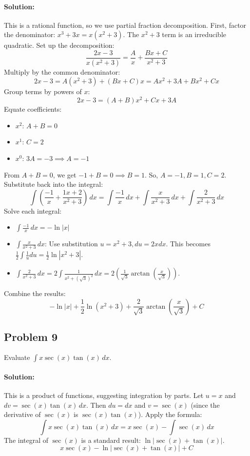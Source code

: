 \documentclass{article}
\begin{document}
\paragraph{Solution:} This is a rational function, so we use partial fraction decomposition.
First, factor the denominator: $x^3 + 3x = x(x^2 + 3)$. The $x^2+3$ term is an irreducible quadratic.
Set up the decomposition:
\[ \frac{2x-3}{x(x^2+3)} = \frac{A}{x} + \frac{Bx+C}{x^2+3} \]
Multiply by the common denominator:
\[ 2x-3 = A(x^2+3) + (Bx+C)x = Ax^2 + 3A + Bx^2 + Cx \]
Group terms by powers of $x$:
\[ 2x-3 = (A+B)x^2 + Cx + 3A \]
Equate coefficients:
\begin{itemize}
    \item $x^2$: $A+B = 0$
    \item $x^1$: $C = 2$
    \item $x^0$: $3A = -3 \implies A = -1$
\end{itemize}
From $A+B=0$, we get $-1+B=0 \implies B=1$.
So, $A=-1, B=1, C=2$.
Substitute back into the integral:
\[ \int \left( \frac{-1}{x} + \frac{1x+2}{x^2+3} \right) \, dx = \int \frac{-1}{x} \, dx + \int \frac{x}{x^2+3} \, dx + \int \frac{2}{x^2+3} \, dx \]
Solve each integral:
\begin{itemize}
    \item $\int \frac{-1}{x} \, dx = -\ln|x|$
    \item $\int \frac{x}{x^2+3} \, dx$: Use substitution $u=x^2+3, du=2xdx$. This becomes $\frac{1}{2}\int \frac{1}{u}du = \frac{1}{2}\ln|x^2+3|$.
    \item $\int \frac{2}{x^2+3} \, dx = 2 \int \frac{1}{x^2+(\sqrt{3})^2} \, dx = 2 \left( \frac{1}{\sqrt{3}}\arctan\left(\frac{x}{\sqrt{3}}\right) \right)$.
\end{itemize}
Combine the results:
\[ \boxed{-\ln|x| + \frac{1}{2}\ln(x^2+3) + \frac{2}{\sqrt{3}}\arctan\left(\frac{x}{\sqrt{3}}\right) + C} \]

\subsection{Problem 9}
Evaluate $\int x \sec(x)\tan(x) \, dx$.
\paragraph{Solution:} This is a product of functions, suggesting integration by parts.
Let $u = x$ and $dv = \sec(x)\tan(x) \, dx$.
Then $du = dx$ and $v = \sec(x)$ (since the derivative of $\sec(x)$ is $\sec(x)\tan(x)$).
Apply the formula:
\[ \int x \sec(x)\tan(x) \, dx = x\sec(x) - \int \sec(x) \, dx \]
The integral of $\sec(x)$ is a standard result: $\ln|\sec(x) + \tan(x)|$.
\[ \boxed{x\sec(x) - \ln|\sec(x) + \tan(x)| + C} \]
\end{document}
